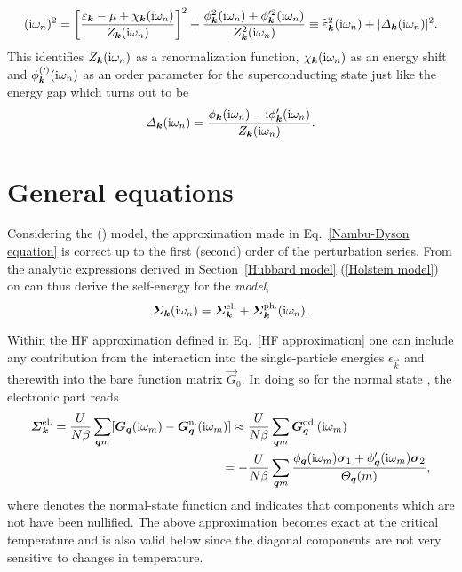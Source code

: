 %
\begin{align*}
    (\mathrm i \omega_n)^2 = \left[ \frac
        {\varepsilon_{\boldsymbol k} - \mu + \chi_{\boldsymbol k}(\mathrm i \omega_n)}
        {Z_{\boldsymbol k}(\mathrm i \omega_n)}
    \right]^2
    + \frac
        {\phi_{\boldsymbol k}^2(\mathrm i \omega_n) + \phi'^2_{\boldsymbol k}(\mathrm i \omega_n)}
        {Z_{\boldsymbol k}^2(\mathrm i \omega_n)}
    \equiv \widetilde {\varepsilon}^2_{\boldsymbol k}(\mathrm i \omega_n)
    + |\varDelta_{\boldsymbol k}(\mathrm i \omega_n)|^2.
\end{align*}
%
This identifies $Z_{\boldsymbol k}(\mathrm i \omega_n)$ as a renormalization function,
$\chi_{\boldsymbol k}(\mathrm i \omega_n)$ as an energy shift and $\phi^{(\prime)}_{\boldsymbol k}(\mathrm i
\omega_n)$ as an order parameter for the superconducting state just like the
energy gap which turns out to be
%
\begin{align*}
    \varDelta_{\boldsymbol k}(\mathrm i \omega_n) = \frac
        {\phi_{\boldsymbol k}(\mathrm i \omega_n) - \mathrm i \phi'_{\boldsymbol k}(\mathrm i \omega_n)}
        {Z_{\boldsymbol k}(\mathrm i \omega_n)}.
\end{align*}

\section{General equations}

Considering the  () model, the approximation made
in Eq.~\ref{Nambu-Dyson equation} is correct up to the first (second) order of
the perturbation series. From the analytic expressions derived in
Section~\ref{Hubbard model} (\ref{Holstein model}) on can thus derive the
self-energy for the \emph{ model},
%
\begin{equation*}
    \boldsymbol {\varSigma}_{\boldsymbol k} (\mathrm i \omega_n)
    = \boldsymbol {\varSigma}_{\boldsymbol k} \sp{\text{el.}}
    + \boldsymbol {\varSigma}_{\boldsymbol k} \sp{\text{ph.}} (\mathrm i \omega_n).
\end{equation*}

Within the HF approximation defined in Eq.~\ref{HF approximation} one can
include any contribution from the  interaction into the
single-particle energies $\epsilon_{\vec k}$ and therewith into the bare
 function matrix $\vec G_0$. In doing so for the normal state
\cite[37]{AllenMitrovic82}, the electronic part reads
%
\begin{align*}
    \boldsymbol {\varSigma}_{\boldsymbol k} \sp{\text{el.}}
    = \frac{U}{N \beta} \sum_{\boldsymbol q m}
        [ \boldsymbol G_{\boldsymbol q} (\mathrm i \omega_m)
        - \boldsymbol G_{\boldsymbol q} \sp{\text{n.}} (\mathrm i \omega_m) ]
    \approx \frac{U}{N \beta} &\sum_{\boldsymbol q m}
        \boldsymbol G_{\boldsymbol q} \sp{\text{od.}} (\mathrm i \omega_m)
    \\
    = -\frac{U}{N \beta} &\sum_{\boldsymbol q m} \frac
        { \phi _{\boldsymbol q}(\mathrm i \omega_m) \boldsymbol \sigma_1
        + \phi'_{\boldsymbol q}(\mathrm i \omega_m) \boldsymbol \sigma_2 }
        {\varTheta_{\boldsymbol q}(m)},
\end{align*}
%
where  denotes the normal-state  function and 
indicates that components which are not  have been nullified.
The above approximation becomes exact at the critical temperature and is also
valid below \cite[38]{AllenMitrovic82} since the diagonal components are not
very sensitive to changes in temperature.

